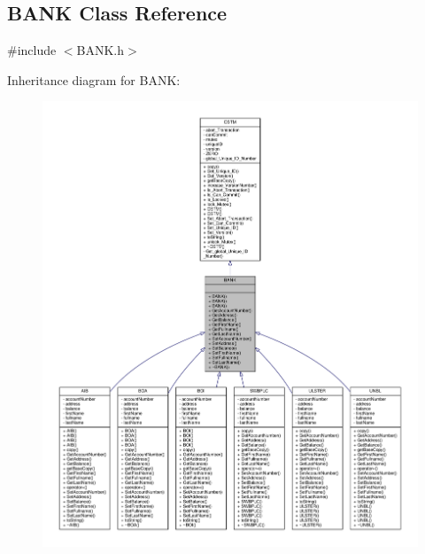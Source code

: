\hypertarget{class_b_a_n_k}{}\subsection{B\+A\+NK Class Reference}
\label{class_b_a_n_k}


{\ttfamily \#include $<$B\+A\+N\+K.\+h$>$}



Inheritance diagram for B\+A\+NK\+:\nopagebreak
\begin{figure}[H]
\begin{center}
\leavevmode
\includegraphics[width=350pt]{class_b_a_n_k__inherit__graph}
\end{center}
\end{figure}


